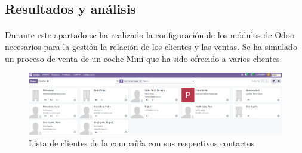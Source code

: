 \subsection{Resultados y análisis}
\paragraph{}
Durante este apartado se ha realizado la configuración de los módulos de Odoo necesarios para la gestión la relación de los clientes y las ventas. Se ha simulado un proceso de venta de un coche Mini que ha sido ofrecido a varios clientes.
\begin{figure}[h]
    \centering
    \includegraphics[width=1\linewidth]{fotosRelacion/clientes.png}
    \caption{Lista de clientes de la compañía con sus respectivos contactos}
    \label{fig:enter-label}
\end{figure}
